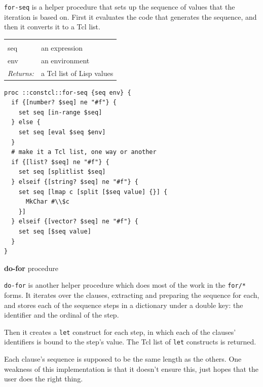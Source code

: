 \documentclass[twoside,9pt]{report}
\begin{document}
\texttt{for-seq} is a helper procedure that sets up the sequence of values that the iteration is based on. First it evaluates the code that generates the sequence, and then it converts it to a Tcl list.

\noindent\begin{tabular}{ |p{1.5cm} p{8cm}| }
\hline
\rowcolor[HTML]{CCCCCC} \multicolumn{2}{|l|}{\bf for-seq (internal)} \\
seq & an expression \\
env & an environment \\
\textit{Returns:} & a Tcl list of Lisp values \\
\hline
\end{tabular}
\begin{lstlisting}
proc ::constcl::for-seq {seq env} {
  if {[number? $seq] ne "#f"} {
    set seq [in-range $seq]
  } else {
    set seq [eval $seq $env]
  }
  # make it a Tcl list, one way or another
  if {[list? $seq] ne "#f"} {
    set seq [splitlist $seq]
  } elseif {[string? $seq] ne "#f"} { 
    set seq [lmap c [split [$seq value] {}] {
      MkChar #\\$c
    }]
  } elseif {[vector? $seq] ne "#f"} {
    set seq [$seq value]
  }
}
\end{lstlisting}


\textbf{do-for} procedure


\texttt{do-for} is another helper procedure which does most of the work in the \texttt{for/*} forms. It iterates over the clauses, extracting and preparing the sequence for each, and stores each of the sequence steps in a dictionary under a double key: the identifier and the ordinal of the step.


Then it creates a \texttt{let} construct for each step, in which each of the clauses' identifiers is bound to the step's value. The Tcl list of \texttt{let} constructs is returned.


Each clause's sequence is supposed to be the same length as the others. One weakness of this implementation is that it doesn't ensure this, just hopes that the user does the right thing.
\end{document}
